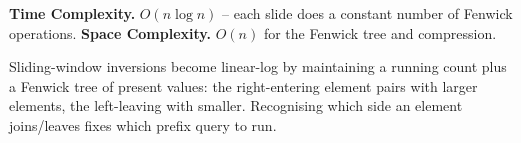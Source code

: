 \begin{complexitybox}
\textbf{Time Complexity.} $O(n\log n)$ -- each slide does a constant number
of Fenwick operations. \textbf{Space Complexity.} $O(n)$ for the Fenwick
tree and compression.
\end{complexitybox}

\begin{takeawaybox}
Sliding-window inversions become linear-log by maintaining a running count
plus a Fenwick tree of present values: the right-entering element pairs
with larger elements, the left-leaving with smaller. Recognising which side
an element joins/leaves fixes which prefix query to run.
\end{takeawaybox}
